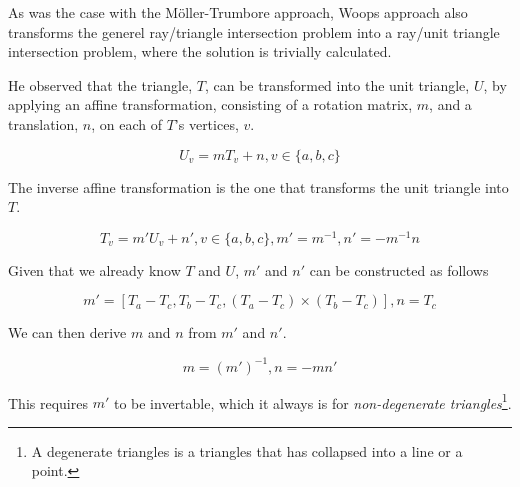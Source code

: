 
As was the case with the Möller-Trumbore approach, Woops approach also
transforms the generel ray/triangle intersection problem into a
ray/unit triangle intersection problem, where the solution is
trivially calculated.

He observed that the triangle, $T$, can be transformed into the unit
triangle, $U$, by applying an affine transformation, consisting of a rotation
matrix, $m$, and a translation, $n$, on each of $T$'s vertices, $v$.

\begin{displaymath}
  U_v = m T_v + n, v \in \{a, b, c\}
\end{displaymath}

The inverse affine transformation is the one that transforms the unit
triangle into $T$.

\begin{displaymath}
  T_v = m' U_v + n', v \in \{a, b, c\}, m' = m^{-1}, n' = -m^{-1}n
\end{displaymath}

Given that we already know $T$ and $U$, $m'$ and $n'$ can be
constructed as follows

\begin{displaymath}
  m' = \left[ T_a - T_c, T_b - T_c, (T_a - T_c) \times (T_b - T_c)
    \right],
  n = T_c
\end{displaymath}

We can then derive $m$ and $n$ from $m'$ and $n'$. 

\begin{displaymath}
  m = (m')^{-1},
  n = - m n'
\end{displaymath}

This requires $m'$ to be invertable, which it always is for
\textit{non-degenerate triangles}\footnote{A degenerate triangles is
  a triangles that has collapsed into a line or a point.}.



